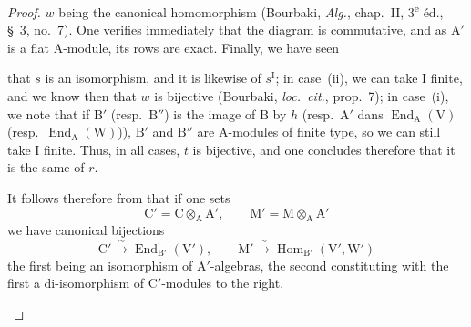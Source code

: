\begin{proof}
$w$ being the canonical homomorphism (Bourbaki, \emph{Alg.}, chap.~II, 3\textsuperscript{e} \'ed., \S~3, no.~7). One verifies immediately that the
diagram  is commutative, and as $\mathrm{A}'$ is a flat $\mathrm{A}$-module, its rows are exact. Finally, we have seen


that $s$ is an isomorphism, and it is likewise of $s^{\mathrm{I}}$; in case~(ii), we can take $\mathrm{I}$ finite, and we know then that
$w$ is bijective (Bourbaki, \emph{loc.\ cit.}, prop.~7); in case~(i), we note that if $\mathrm{B}'$ (resp.\ $\mathrm{B}''$) is the image of $\mathrm{B}$ by $h$
(resp.\ $\mathrm{A}'$ dans $\operatorname{End}_{\mathrm{A}}(\mathrm{V})$ (resp.\ $\operatorname{End}_{\mathrm{A}}(\mathrm{W})$)), $\mathrm{B}'$ and $\mathrm{B}''$ are $\mathrm{A}$-modules of finite type, so we can still take $\mathrm{I}$
finite. Thus, in all cases, $t$ is bijective, and one concludes therefore that it is the same of $r$.

\begin{env}[2.5.8.6]
\label{IV.2.5.8.6}
It follows therefore from  that if one sets
\[
  \mathrm{C}'=\mathrm{C}\otimes_{\mathrm{A}}\mathrm{A}',\qquad \mathrm{M}'=\mathrm{M}\otimes_{\mathrm{A}}\mathrm{A}'
\]
we have canonical bijections
\[
  \mathrm{C}' \xrightarrow{\;\sim\;} \operatorname{End}_{\mathrm{B}'}(\mathrm{V}'),\qquad \mathrm{M}' \xrightarrow{\;\sim\;} \operatorname{Hom}_{\mathrm{B}'}(\mathrm{V}',\mathrm{W}')
\]
the first being an isomorphism of $\mathrm{A}'$-algebras, the second constituting with the first a di-isomorphism
of $\mathrm{C}'$-modules to the right.
\end{env}


\end{proof}
